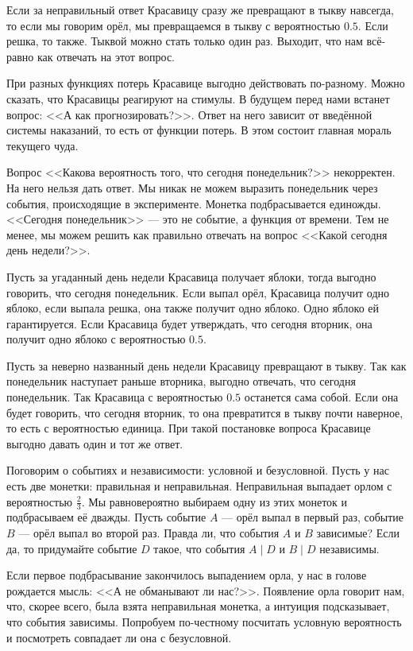 Если за неправильный ответ Красавицу сразу же превращают в тыкву навсегда, то если мы говорим орёл, мы превращаемся в тыкву с вероятностью $0.5$. Если решка, то также. Тыквой можно стать только один раз. Выходит, что нам всё-равно как отвечать на этот вопрос.

При разных функциях потерь Красавице выгодно действовать по-разному. Можно сказать, что Красавицы реагируют на стимулы. В будущем перед нами встанет вопрос: <<А как прогнозировать?>>. Ответ на него зависит от введённой системы наказаний, то есть от функции потерь. В этом состоит главная мораль текущего чуда. 

Вопрос <<Какова вероятность того, что сегодня понедельник?>> некорректен. На него нельзя дать ответ. Мы никак не можем выразить понедельник через события, происходящие в эксперименте. Монетка подбрасывается единожды. <<Сегодня понедельник>> --- это не событие, а функция от времени. Тем не менее, мы можем решить как правильно отвечать на вопрос <<Какой сегодня день недели?>>.

Пусть за угаданный день недели Красавица получает яблоки, тогда выгодно говорить, что сегодня понедельник. Если выпал орёл, Красавица получит одно яблоко, если выпала решка, она также получит одно яблоко. Одно яблоко ей гарантируется. Если Красавица будет утверждать, что сегодня вторник, она получит одно яблоко с вероятностью $0.5$.

Пусть за неверно названный день недели Красавицу превращают в тыкву. Так как понедельник наступает раньше вторника, выгодно отвечать, что сегодня понедельник. Так Красавица с вероятностью $0.5$ останется сама собой. Если она будет говорить, что сегодня вторник, то она превратится в тыкву почти наверное, то есть с вероятностью единица. При такой постановке вопроса Красавице выгодно давать один и тот же ответ.

\begin{chudo}
Поговорим о событиях и независимости: условной и безусловной. Пусть у нас есть две монетки: правильная и неправильная. Неправильная выпадает орлом с вероятностью $\frac{2}{3}$. Мы равновероятно выбираем одну из этих монеток и подбрасываем её дважды. Пусть событие $A$ --- орёл выпал в первый раз, событие $B$ --- орёл выпал во второй раз. Правда ли, что события $A$ и $B$ зависимые? Если да, то придумайте событие $D$ такое, что события $A \mid D$ и $B \mid D$ независимы.
\end{chudo}

Если первое подбрасывание закончилось выпадением орла, у нас в голове рождается мысль: <<А не обманывают ли нас?>>. Появление орла говорит нам, что, скорее всего, была взята неправильная монетка, а интуиция подсказывает, что события зависимы. Попробуем по-честному посчитать условную вероятность и посмотреть совпадает ли она с безусловной.

